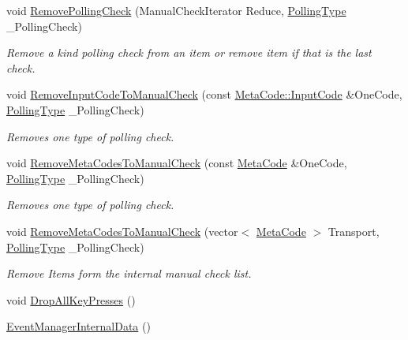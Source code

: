 \begin{DoxyCompactItemize}
void \hyperlink{structphys_1_1internal_1_1EventManagerInternalData_ab5d884b9731f79069ae4bd890dd15748}{RemovePollingCheck} (ManualCheckIterator Reduce, \hyperlink{structphys_1_1internal_1_1EventManagerInternalData_ab9ab8380b84448aacf46a63050e159af}{PollingType} \_\-PollingCheck)
\begin{DoxyCompactList}\small\item\em Remove a kind polling check from an item or remove item if that is the last check. \item\end{DoxyCompactList}\item 
void \hyperlink{structphys_1_1internal_1_1EventManagerInternalData_aadc9e786da13f2c669fc7e054d8fbf37}{RemoveInputCodeToManualCheck} (const \hyperlink{classphys_1_1MetaCode_a3e501cbb5bf0f6f1fdb7211465bda8d8}{MetaCode::InputCode} \&OneCode, \hyperlink{structphys_1_1internal_1_1EventManagerInternalData_ab9ab8380b84448aacf46a63050e159af}{PollingType} \_\-PollingCheck)
\begin{DoxyCompactList}\small\item\em Removes one type of polling check. \item\end{DoxyCompactList}\item 
void \hyperlink{structphys_1_1internal_1_1EventManagerInternalData_ade8d03121322cc467086d08df286cd51}{RemoveMetaCodesToManualCheck} (const \hyperlink{classphys_1_1MetaCode}{MetaCode} \&OneCode, \hyperlink{structphys_1_1internal_1_1EventManagerInternalData_ab9ab8380b84448aacf46a63050e159af}{PollingType} \_\-PollingCheck)
\begin{DoxyCompactList}\small\item\em Removes one type of polling check. \item\end{DoxyCompactList}\item 
void \hyperlink{structphys_1_1internal_1_1EventManagerInternalData_a54babcae1822814f09beace684f97e72}{RemoveMetaCodesToManualCheck} (vector$<$ \hyperlink{classphys_1_1MetaCode}{MetaCode} $>$ Transport, \hyperlink{structphys_1_1internal_1_1EventManagerInternalData_ab9ab8380b84448aacf46a63050e159af}{PollingType} \_\-PollingCheck)
\begin{DoxyCompactList}\small\item\em Remove Items form the internal manual check list. \item\end{DoxyCompactList}\item 
void \hyperlink{structphys_1_1internal_1_1EventManagerInternalData_ab1f4a0b147beb750deb77e000daa27cc}{DropAllKeyPresses} ()
\item 
\hypertarget{structphys_1_1internal_1_1EventManagerInternalData_a2bc6e8af4992cc8b4935f4e5b32b32a0}{
\hyperlink{structphys_1_1internal_1_1EventManagerInternalData_a2bc6e8af4992cc8b4935f4e5b32b32a0}{EventManagerInternalData} ()}
\label{d6/d3a/structphys_1_1internal_1_1EventManagerInternalData_a2bc6e8af4992cc8b4935f4e5b32b32a0}


\end{DoxyCompactItemize}
